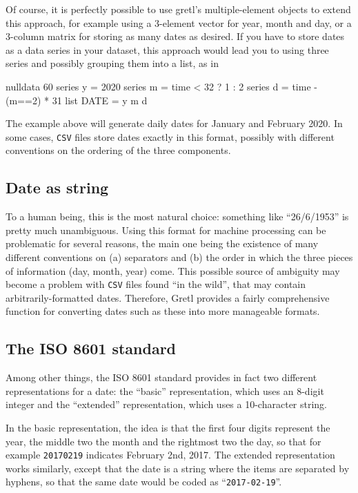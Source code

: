 Of course, it is perfectly possible to use gretl's multiple-element
objects to extend this approach, for example using a 3-element vector
for year, month and day, or a 3-column matrix for storing as many
dates as desired. If you have to store dates as a data series in your
dataset, this approach would lead you to using three series and
possibly grouping them into a list, as in
\begin{code}
  nulldata 60
  series y = 2020
  series m = time < 32 ? 1 : 2
  series d = time - (m==2) * 31
  list DATE = y m d
\end{code}
The example above will generate daily dates for January and February
2020. In some cases, \texttt{CSV} files store dates exactly in this
format, possibly with different conventions on the ordering of the
three components.

\subsection{Date as string}
\label{sec:cal-generic-string}

To a human being, this is the most natural choice: something like
``26/6/1953'' is pretty much unambiguous. Using this format for
machine processing can be problematic for several reasons, the main
one being the existence of many different conventions on (a)
separators and (b) the order in which the three pieces of information
(day, month, year) come. This possible source of ambiguity may become
a problem with \texttt{CSV} files found ``in the wild'', that may
contain arbitrarily-formatted dates. Therefore, Gretl provides a
fairly comprehensive function for converting dates such as these into
more manageable formats.

\subsection{The ISO 8601 standard}
\label{sec:cal-ISO8601}

Among other things, the ISO 8601 standard provides in fact two
different representations for a date: the ``basic'' representation,
which uses an 8-digit integer and the ``extended'' representation,
which uses a 10-character string.

In the basic representation, the idea is that the first four digits
represent the year, the middle two the month and the rightmost two the
day, so that for example \texttt{20170219} indicates February 2nd,
2017. The extended representation works similarly, except that the
date is a string where the items are separated by hyphens, so that the
same date would be coded as ``\texttt{2017-02-19}''.

